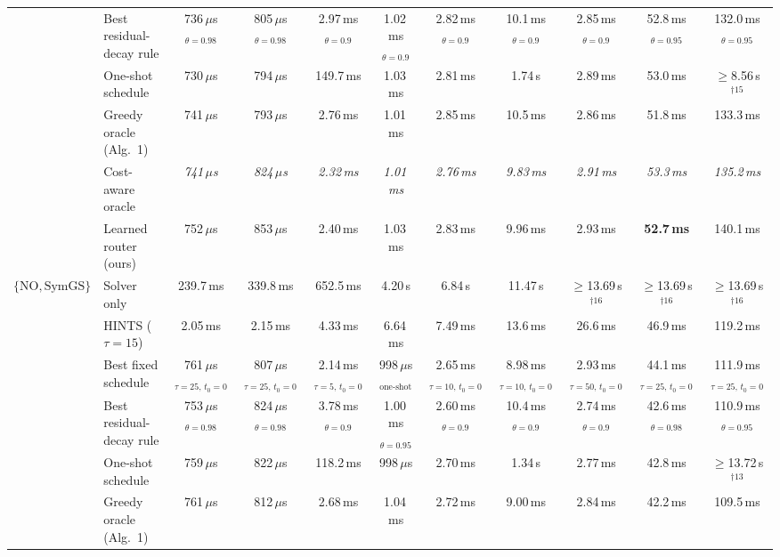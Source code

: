 {\begin{tabular}{llccccccccc}
 & Best residual-decay rule & 736\,$\mu$s$_{\theta{=}0.98}$ & 805\,$\mu$s$_{\theta{=}0.98}$ & 2.97\,ms$_{\theta{=}0.9}$ & 1.02\,ms$_{\theta{=}0.9}$ & 2.82\,ms$_{\theta{=}0.9}$ & 10.1\,ms$_{\theta{=}0.9}$ & 2.85\,ms$_{\theta{=}0.9}$ & 52.8\,ms$_{\theta{=}0.95}$ & 132.0\,ms$_{\theta{=}0.95}$ \\
 & One-shot schedule & 730\,$\mu$s & 794\,$\mu$s & 149.7\,ms & 1.03\,ms & 2.81\,ms & 1.74\,s & 2.89\,ms & 53.0\,ms & $\geq$8.56\,s$^{\dagger 15}$ \\
 & Greedy oracle (Alg.~1) & 741\,$\mu$s & 793\,$\mu$s & 2.76\,ms & 1.01\,ms & 2.85\,ms & 10.5\,ms & 2.86\,ms & 51.8\,ms & 133.3\,ms \\
 & Cost-aware oracle & \textit{741\,$\mu$s} & \textit{824\,$\mu$s} & \textit{2.32\,ms} & \textit{1.01\,ms} & \textit{2.76\,ms} & \textit{9.83\,ms} & \textit{2.91\,ms} & \textit{53.3\,ms} & \textit{135.2\,ms} \\
 & Learned router (ours) & 752\,$\mu$s & 853\,$\mu$s & 2.40\,ms & 1.03\,ms & 2.83\,ms & 9.96\,ms & 2.93\,ms & \textbf{52.7\,ms} & 140.1\,ms \\
\midrule
$\{\mathrm{NO}, \text{SymGS}\}$ & Solver only & 239.7\,ms & 339.8\,ms & 652.5\,ms & 4.20\,s & 6.84\,s & 11.47\,s & $\geq$13.69\,s$^{\dagger 16}$ & $\geq$13.69\,s$^{\dagger 16}$ & $\geq$13.69\,s$^{\dagger 16}$ \\
 & HINTS ($\tau{=}15$) & 2.05\,ms & 2.15\,ms & 4.33\,ms & 6.64\,ms & 7.49\,ms & 13.6\,ms & 26.6\,ms & 46.9\,ms & 119.2\,ms \\
 & Best fixed schedule & 761\,$\mu$s$_{\tau{=}25,\,t_0{=}0}$ & 807\,$\mu$s$_{\tau{=}25,\,t_0{=}0}$ & 2.14\,ms$_{\tau{=}5,\,t_0{=}0}$ & 998\,$\mu$s$_{\text{one-shot}}$ & 2.65\,ms$_{\tau{=}10,\,t_0{=}0}$ & 8.98\,ms$_{\tau{=}10,\,t_0{=}0}$ & 2.93\,ms$_{\tau{=}50,\,t_0{=}0}$ & 44.1\,ms$_{\tau{=}25,\,t_0{=}0}$ & 111.9\,ms$_{\tau{=}25,\,t_0{=}0}$ \\
 & Best residual-decay rule & 753\,$\mu$s$_{\theta{=}0.98}$ & 824\,$\mu$s$_{\theta{=}0.98}$ & 3.78\,ms$_{\theta{=}0.9}$ & 1.00\,ms$_{\theta{=}0.95}$ & 2.60\,ms$_{\theta{=}0.9}$ & 10.4\,ms$_{\theta{=}0.9}$ & 2.74\,ms$_{\theta{=}0.9}$ & 42.6\,ms$_{\theta{=}0.98}$ & 110.9\,ms$_{\theta{=}0.95}$ \\
 & One-shot schedule & 759\,$\mu$s & 822\,$\mu$s & 118.2\,ms & 998\,$\mu$s & 2.70\,ms & 1.34\,s & 2.77\,ms & 42.8\,ms & $\geq$13.72\,s$^{\dagger 13}$ \\
 & Greedy oracle (Alg.~1) & 761\,$\mu$s & 812\,$\mu$s & 2.68\,ms & 1.04\,ms & 2.72\,ms & 9.00\,ms & 2.84\,ms & 42.2\,ms & 109.5\,ms \\

\end{tabular}}
